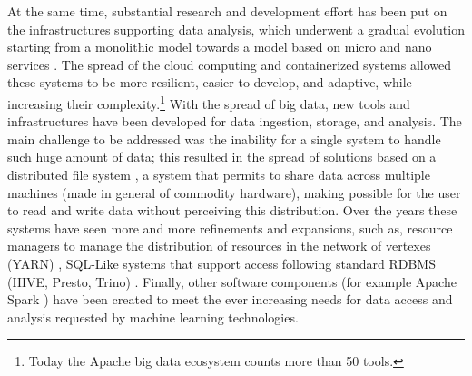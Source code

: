 At the same time, substantial research and development effort has been put on the infrastructures supporting data analysis, which underwent a gradual evolution starting from a monolithic model towards a model based on micro and nano services \cite{kratzke2018brief}. The spread of the cloud computing and  containerized systems allowed these systems to be more resilient, easier to develop, and adaptive, while increasing their complexity.\footnote{Today the Apache big data ecosystem counts more than 50 tools.}
With the spread of big data, new tools and infrastructures have been developed for data ingestion, storage, and analysis. The main challenge to be addressed was the inability for a single system to handle such huge amount of data; this resulted in the spread of solutions based on a distributed file system \cite{blomer2015survey}, a system that permits to share data across multiple machines (made in general of commodity hardware), making possible for the user to read and write data without perceiving this distribution. Over the years these systems have seen more and more refinements and expansions, such as, resource managers to manage the distribution of resources in the network of vertexes (YARN) \cite{kulkarni2014survey}, SQL-Like systems that support access following standard RDBMS (HIVE, Presto, Trino) \cite{thusoo2009hive,sethi2019presto}. Finally, other software components (for example Apache Spark \cite{salloum2016big}) have been created to meet the ever increasing needs for data access and analysis requested by machine learning technologies.
